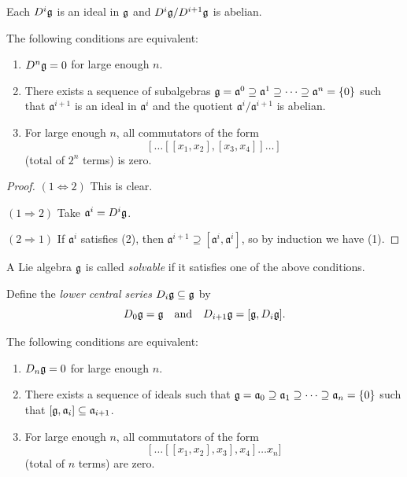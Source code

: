 \begin{remark}
  Each $D^i \mathfrak{g}$ is an ideal in $\mathfrak{g}$
  and $D^i \mathfrak{g} / D^{i + 1} \mathfrak{g}$ is abelian.
\end{remark}

\begin{prop}
  The following conditions are equivalent:
  \begin{enumerate}
    \item $D^n \mathfrak{g} = 0$ for large enough $n$.
    \item There exists a sequence of subalgebras
      $\mathfrak{g} = \mathfrak{a}^0 \supseteq \mathfrak{a}^1 \supseteq \cdots
      \supseteq \mathfrak{a}^n = \{0\}$
      such that $\mathfrak{a}^{i + 1}$ is an ideal
      in $\mathfrak{a}^i$ and
      the quotient $\mathfrak{a}^i / \mathfrak{a}^{i + 1}$
      is abelian.
    \item For large enough $n$, all commutators
      of the form
      \[
        [\dots [[x_1, x_2], [x_3, x_4]] \dots]
      \]
      (total of $2^n$ terms) is zero.
  \end{enumerate}
\end{prop}

\begin{proof}
  $(1 \Leftrightarrow 2)$ This is clear.

  $(1 \Rightarrow 2)$ Take
  $\mathfrak{a}^i = D^i \mathfrak{g}$.

  $(2 \Rightarrow 1)$ If
  $\mathfrak{a}^i$ satisfies (2), then
  $\mathfrak{a}^{i + 1} \supseteq [\mathfrak{a}^i, \mathfrak{a}^i]$, so
  by induction we have (1).
\end{proof}

\begin{definition}
  A Lie algebra $\mathfrak{g}$ is called
  \emph{solvable} if it satisfies one of
  the above conditions.
\end{definition}

\begin{definition}
  Define the \emph{lower central series} $D_i \mathfrak{g} \subseteq \mathfrak{g}$
  by
  \[
    D_0\mathfrak{g} = \mathfrak{g}
    \quad \text{and} \quad
    D_{i + 1} \mathfrak{g} = [\mathfrak{g}, D_i \mathfrak{g}].
  \]
\end{definition}

\begin{prop}
  The following conditions are equivalent:
  \begin{enumerate}
    \item $D_n \mathfrak{g} = 0$ for large enough $n$.
    \item There exists a sequence of
      ideals such that
      $\mathfrak{g} = \mathfrak{a}_0 \supseteq \mathfrak{a}_1 \supseteq \cdots \supseteq \mathfrak{a}_n = \{0\}$
      such that $[\mathfrak{g}, \mathfrak{a}_i] \subseteq \mathfrak{a}_{i + 1}$.
    \item For large enough $n$, all
      commutators of the form
      \[
        [\dots [[x_1, x_2], x_3], x_4] \dots x_n]
      \]
      (total of $n$ terms) are zero.
  \end{enumerate}
\end{prop}

